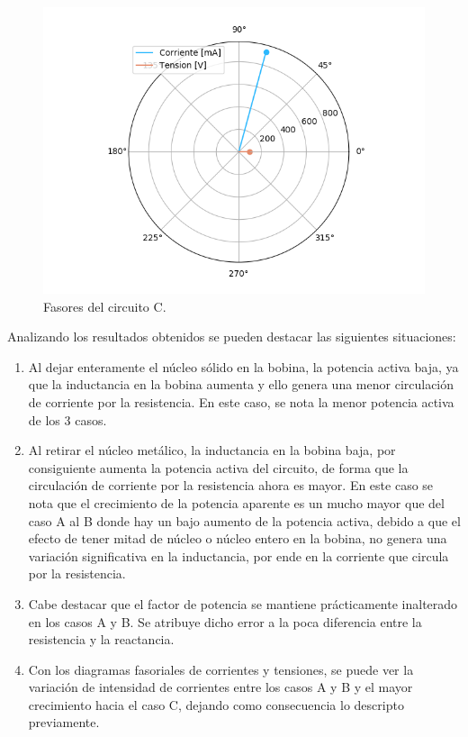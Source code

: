 \documentclass[a4paper]{article}
\begin{document}
\begin{figure}[H]
\centering
\begin{minipage}{.5\textwidth}
	\centering
	\includegraphics[width=1.2\linewidth]{Fasorial-1C.png}
	\caption{Fasores del circuito C.}
	\label{fig:faso-1c}
\end{minipage}
\end{figure}

Analizando los resultados obtenidos se pueden destacar las siguientes situaciones:
\begin{enumerate}

	\item Al dejar enteramente el núcleo sólido en la bobina, la potencia activa baja, ya que la inductancia en la bobina aumenta y ello genera una menor circulación de corriente por la resistencia. En este caso, se nota la menor potencia activa de los 3 casos.

	\item Al retirar el núcleo metálico, la inductancia en la bobina baja, por consiguiente aumenta la potencia activa del circuito, de forma que la circulación de corriente por la resistencia ahora es mayor. En este caso se nota que el crecimiento de la potencia aparente es un mucho mayor que del caso A al B donde hay un bajo aumento de la potencia activa, debido a que el efecto de tener mitad de núcleo o núcleo entero en la bobina, no genera una variación significativa en la inductancia, por ende en la corriente que circula por la resistencia.

	\item Cabe destacar que el factor de potencia se mantiene prácticamente inalterado en los casos A y B. Se atribuye dicho error a la poca diferencia entre la resistencia y la reactancia.

	\item Con los diagramas fasoriales de corrientes y tensiones, se puede ver la variación de intensidad de corrientes entre los casos A y B y el mayor crecimiento hacia el caso C, dejando como consecuencia lo descripto previamente.

\end{enumerate}
\end{document}
